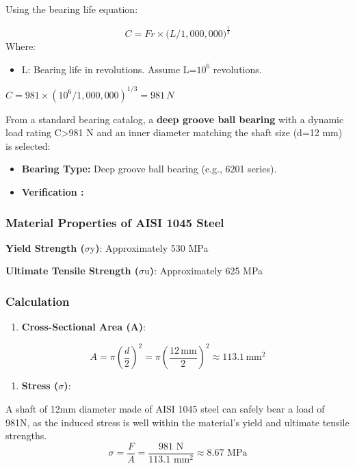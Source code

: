 \documentclass[../../main]{subfiles}
\begin{document}
Using the bearing life equation:

$$C = Fr \times (L/1,000,00{0)}^{\frac{1}{3}}$$
Where:

\begin{itemize}
\item
  L: Bearing life in revolutions. Assume L=\(10^{6}\) revolutions.
\end{itemize}

\(C = 981 \times (10^{6}/1,000,000)^{1/3} = 981\, N\)

From a standard bearing catalog, a \textbf{deep groove ball bearing}
with a dynamic load rating C\textgreater981 N and an inner diameter
matching the shaft size (d=12 mm) is selected:

\begin{itemize}
\item
  \textbf{Bearing Type:} Deep groove ball bearing (e.g., 6201 series).
\item
  \textbf{Verification :}
\end{itemize}

\subsubsection{Material Properties of AISI 1045 Steel}

\textbf{Yield Strength (}$\sigma$y\textbf{)}: Approximately 530 MPa

\textbf{Ultimate Tensile Strength (}$\sigma$u\textbf{)}: Approximately 625 MPa

\subsubsection{Calculation}

\begin{enumerate}
\def\labelenumi{\arabic{enumi}.}
\item
  \textbf{Cross-Sectional Area (A)}:
\end{enumerate}


$$A=\pi\left(\frac{d}{2}\right)^2=\pi\left(\frac{12\, \text{mm}}{2}\right)^2 \approx 113.1\, \text{mm}^2$$

\begin{enumerate}
\def\labelenumi{\arabic{enumi}.}
\setcounter{enumi}{1}
\item
  \textbf{Stress (}$\sigma$\textbf{)}:
\end{enumerate}


A shaft of 12mm diameter made of AISI 1045 steel can safely bear a load of 981N, as the induced stress is well within the material's yield and ultimate tensile strengths.
$$
\sigma = \frac{F}{A} = \frac{981 \text{ N}}{113.1 \text{ mm}^2} \approx 8.67 \text{ MPa}
$$
\end{document}
